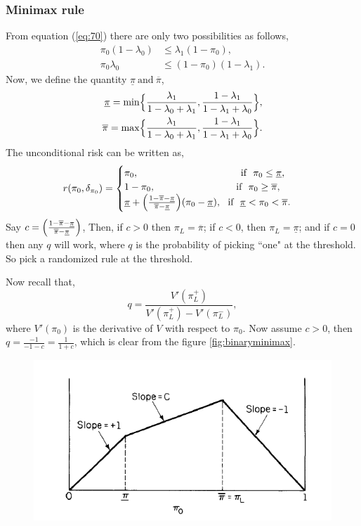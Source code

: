 \documentclass[a4paper,english,12pt]{article}
\begin{document}
\begin{exmp}
\subsubsection*{Minimax rule}
From equation (\ref{eq:70}) there are only two possibilities as follows,
\begin{align}
\pi_{0}(1-\lambda_{0})&\leq\lambda_{1}(1-\pi_{0}),\\\nonumber
\pi_{0}\lambda_{0}&\leq(1-\pi_{0})(1-\lambda_{1}).
\end{align}
Now, we define the quantity $\underline{\pi}~\mbox{and}~\overline{\pi}$, 
\begin{eqnarray}
\underline{\pi}=\min\Bigl\{\frac{\lambda_{1}}{1-\lambda_{0}+\lambda_{1}},\frac{1-\lambda_{1}}{1-\lambda_{1}+\lambda_{0}}\Bigr\},\nonumber\\
\overline{\pi}=\max\Bigl\{\frac{\lambda_{1}}{1-\lambda_{0}+\lambda_{1}},\frac{1-\lambda_{1}}{1-\lambda_{1}+\lambda_{0}}\Bigr\}.\nonumber
\end{eqnarray}
The unconditional risk can be written as,
\begin{equation}
r(\pi_0,\delta_{\pi_0})= \begin{cases} \pi_0,\hspace{105pt} \mbox{if}~~ \pi_0\leq\underline{\pi},\\
 						1-\pi_0, \hspace{83pt}\mbox{if} ~~\pi_0\geq\overline{\pi},  \\
  						\underline{\pi}+\Bigl(\frac{1-\overline{\pi}-\underline{\pi}}{\overline{\pi}-\underline{\pi}}\Big)(\pi_0-\underline{\pi}),~~\mbox{if} ~~\underline{\pi}<\pi_0<\overline{\pi}.
\end{cases}
\end{equation}
Say $c=\Bigl(\frac{1-\overline{\pi}-\underline{\pi}}{\overline{\pi}-\underline{\pi}}\Bigr)$, Then, if $c>0$ then $\pi_L=\overline{\pi}$; if $c<0$, then $\pi_L=\underline{\pi}$; and if $c=0$ then any $q$ will work, where $q$ is the probability of picking ``one" at the threshold. So pick a randomized rule at the threshold.
\par Now recall that,
\begin{equation}
q= \frac{V'(\pi^+_L)}{V'(\pi^+_L)-V'(\pi^-_L)},
\end{equation}
where $V'(\pi_0)$ is the derivative of $V$ with respect to $\pi_0$. Now assume $c>0$, then $q=\frac{-1}{-1-c}=\frac{1}{1+c}$, which is clear from the figure \ref{fig:binaryminimax}.
\begin{figure}[h!]
\centering
\includegraphics[width=0.6\linewidth]{Figures/Binary_Minimax}

\end{figure}
\end{exmp}
\end{document}
